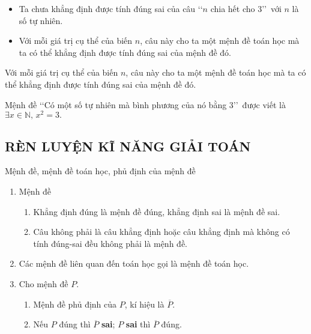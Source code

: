 \documentclass[Main.tex]{subfiles}
\begin{document}
	\begin{trithuc}
		\begin{itemize}
			\item Ta chưa khẳng định được tính đúng sai của câu \lq\lq $n$ chia hết cho $3$\rq\rq\ với $n$ là số tự nhiên.
			\item Với mỗi giá trị cụ thể của biến $n$, câu này cho ta một mệnh đề toán học mà ta có thể khẳng định được tính đúng sai của mệnh đề đó.
		\end{itemize}
	\end{trithuc}
	\begin{luuy}
		Với mỗi giá trị cụ thể của biến $n$, câu này cho ta một mệnh đề toán học mà ta có thể khẳng định được tính đúng sai của mệnh đề đó.
	\end{luuy}
	
	\begin{vd}
		Mệnh đề \lq\lq Có một số tự nhiên mà bình phương của nó bằng 3\rq\rq\ được viết là
		$\exists x \in \mathbb{N},\, x^2=3.$
	\end{vd}
	
	\subsection{RÈN LUYỆN KĨ NĂNG GIẢI TOÁN}
	\begin{dang}{Mệnh đề, mệnh đề toán học, phủ định của mệnh đề}
		\begin{enumerate}
			\item Mệnh đề
			\begin{enumerate}
				\item Khẳng định đúng là mệnh đề đúng, khẳng định sai là mệnh đề sai.
				\item Câu không phải là câu khẳng định hoặc câu khẳng định mà không có tính đúng-sai đều không phải là mệnh đề.
			\end{enumerate}
			\item Các mệnh đề liên quan đến toán học gọi là mệnh đề toán học.
			\item Cho mệnh đề $P$. 
			\begin{enumerate}
				\item Mệnh đề phủ định của $P$, kí hiệu là $\overline{P}$.
				\item Nếu $P$ đúng thì $\overline{P}$ \textbf{sai}; $P$ \textbf{sai} thì $\overline{P}$ đúng.
			\end{enumerate}
		\end{enumerate}	
	\end{dang}
	
\end{document}
